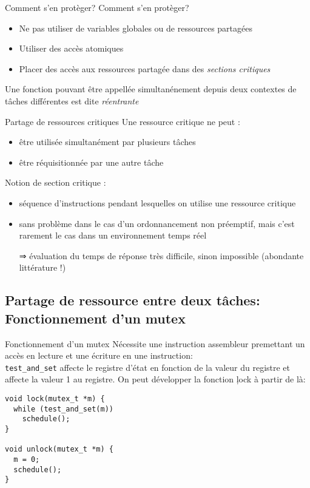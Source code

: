 \begin{frame}{Comment s'en protèger?}
  Comment s'en protèger?
  \begin{itemize} 
  \item  Ne  pas  utiliser  de  variables globales  ou  de  ressources
    partagées
  \item Utiliser des accès atomiques
  \item   Placer  des   accès   aux  ressources   partagée  dans   des
    \emph{sections critiques}
  \end{itemize} 
  Une  fonction  pouvant  être  appellée simultanénement  depuis  deux
  contextes de tâches différentes est dite \emph{réentrante}
\end{frame} 

\begin{frame}{Partage de ressources critiques} 
  Une ressource critique ne peut :
  \begin{itemize}
  \item être utilisée simultanément par plusieurs tâches
  \item être réquisitionnée par une autre tâche
  \end{itemize}
  Notion de section critique :
  \begin{itemize}
  \item  séquence  d'instructions pendant  lesquelles  on utilise  une
    ressource critique
  \item sans  problème dans le cas d'un  ordonnancement non préemptif,
    mais  c'est rarement  le cas  dans un  environnement temps  réel
  \item[⇒]  évaluation  du  temps  de réponse  très  difficile,  sinon
    impossible (abondante littérature !)
  \end{itemize}
\end{frame}

\subsection{Partage de ressource entre deux tâches: Fonctionnement d'un mutex}

\begin{frame}[fragile]{Fonctionnement d'un mutex}
  Nécessite une instruction assembleur  premettant un accès en lecture
  et une écriture  en une instruction: \\
  \texttt{test\_and\_set} affecte le registre d'état en fonction de la
  valeur  du registre  et affecte  la valeur  1 au  registre.  On peut
  développer la fonction \c{lock} à partir de là:
  \begin{lstlisting} 
void lock(mutex_t *m) {
  while (test_and_set(m))
    schedule();
}

void unlock(mutex_t *m) {
  m = 0;
  schedule();
}
  \end{lstlisting} 
\end{frame}

